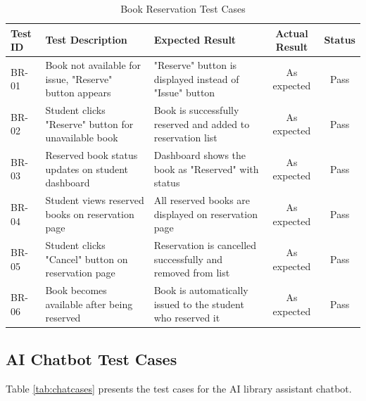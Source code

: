 \documentclass[12pt,a4paper]{report}
\begin{document}
\begin{table}[H]
\centering
\begin{tabularx}{\textwidth}{|l|X|X|c|c|}
\hline
\textbf{Test ID} & \textbf{Test Description} & \textbf{Expected Result} & \textbf{Actual Result} & \textbf{Status} \\
\hline
BR-01 & Book not available for issue, "Reserve" button appears & "Reserve" button is displayed instead of "Issue" button & As expected & Pass \\
\hline
BR-02 & Student clicks "Reserve" button for unavailable book & Book is successfully reserved and added to reservation list & As expected & Pass \\
\hline
BR-03 & Reserved book status updates on student dashboard & Dashboard shows the book as "Reserved" with status & As expected & Pass \\
\hline
BR-04 & Student views reserved books on reservation page & All reserved books are displayed on reservation page & As expected & Pass \\
\hline
BR-05 & Student clicks "Cancel" button on reservation page & Reservation is cancelled successfully and removed from list & As expected & Pass \\
\hline
BR-06 & Book becomes available after being reserved & Book is automatically issued to the student who reserved it & As expected & Pass \\
\hline
\end{tabularx}
\caption{Book Reservation Test Cases}
\label{tab:reservationcases}
\end{table}

\newpage

\subsection{AI Chatbot Test Cases}

Table \ref{tab:chatcases} presents the test cases for the AI library assistant chatbot.

\vspace{0.5cm}
\end{document}
